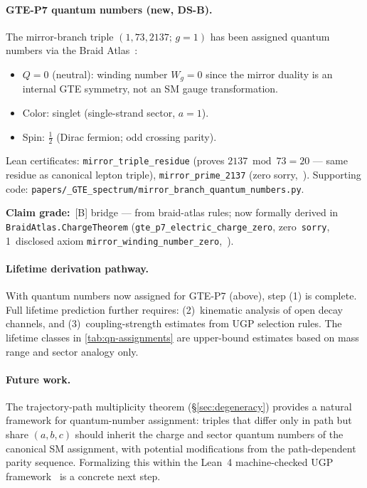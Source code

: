 \documentclass[12pt]{article}
\numberwithin{equation}{section}
\begin{document}
\paragraph{GTE-P7 quantum numbers (new, DS-B).}
The mirror-branch triple $(1,\allowbreak 73,\allowbreak 2137;\,g{=}1)$
has been assigned quantum numbers via the Braid
Atlas~\cite{SpivackBraidAtlas}:
\begin{itemize}[leftmargin=1.5em,itemsep=0pt]
  \item $Q = 0$ (neutral): winding number $W_g = 0$ since the mirror duality
    is an internal GTE symmetry, not an SM gauge transformation.
  \item Color: singlet (single-strand sector, $a=1$).
  \item Spin: $\frac{1}{2}$ (Dirac fermion; odd crossing parity).
\end{itemize}
Lean certificates: \texttt{mirror\_triple\_residue} (proves $2137\bmod 73 = 20$
--- same residue as canonical lepton triple),
\texttt{mirror\_prime\_2137}
(zero sorry,~\cite{ugp-lean}).
Supporting code:
\texttt{papers/\_GTE\_spectrum/\allowbreak mirror\_branch\_quantum\_numbers.py}.

\begin{sloppypar}
\noindent\textbf{Claim grade:}~[B] bridge --- from braid-atlas rules;
now formally derived in \texttt{BraidAtlas.ChargeTheorem}
(\texttt{gte\_p7\_electric\_charge\_zero}, zero~\texttt{sorry},
1~disclosed axiom \texttt{mirror\_winding\_number\_zero},~\cite{ugp-lean}).
\end{sloppypar}

\paragraph{Lifetime derivation pathway.} With quantum numbers now assigned for GTE-P7
(above), step (1) is complete. Full lifetime prediction further requires:
(2)~kinematic analysis of open decay channels, and (3)~coupling-strength estimates from UGP selection rules.
The lifetime classes in \cref{tab:qn-assignments} are upper-bound estimates based on mass range and sector analogy only.

\paragraph{Future work.} The trajectory-path multiplicity theorem (\S\ref{sec:degeneracy}) provides a natural framework for quantum-number assignment: triples that differ only in path but share $(a,b,c)$ should inherit the charge and sector quantum numbers of the canonical SM assignment, with potential modifications from the path-dependent parity sequence. Formalizing this within the Lean~4 machine-checked UGP framework~\cite{ugp-lean} is a concrete next step.
\end{document}
